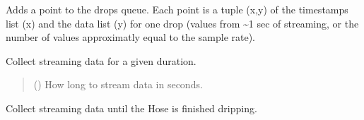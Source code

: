 \documentclass[letterpaper,10pt,english]{sphinxmanual}
\begin{document}
\begin{fulllineitems}
\begin{fulllineitems}
\end{fulllineitems}


\begin{fulllineitems}
\label{\detokenize{PodApi.Stream:PodApi.Stream.DataBucket.Bucket._CollectDrop}}
\pysigstartsignatures
{}
\pysigstopsignatures
\sphinxAtStartPar
Adds a point to the drops queue. Each point is a tuple (x,y) of the         timestamps list (x) and the data list (y) for one drop (values from         \textasciitilde{}1 sec of streaming, or the number of values approximatly equal to         the sample rate).

\end{fulllineitems}


\begin{fulllineitems}
\label{\detokenize{PodApi.Stream:PodApi.Stream.DataBucket.Bucket._CollectForDuration}}
\pysigstartsignatures
{}
\pysigstopsignatures
\sphinxAtStartPar
Collect streaming data for a given duration.
\begin{quote}\begin{description}
\sphinxAtStartPar
{} () \textendash{} How long to stream data in seconds.

\end{description}\end{quote}

\end{fulllineitems}


\begin{fulllineitems}
\label{\detokenize{PodApi.Stream:PodApi.Stream.DataBucket.Bucket._CollectWhileOpen}}
\pysigstartsignatures
{}
\pysigstopsignatures
\sphinxAtStartPar
Collect streaming data until the Hose is finished dripping.


\end{fulllineitems}
\end{fulllineitems}
\end{document}

